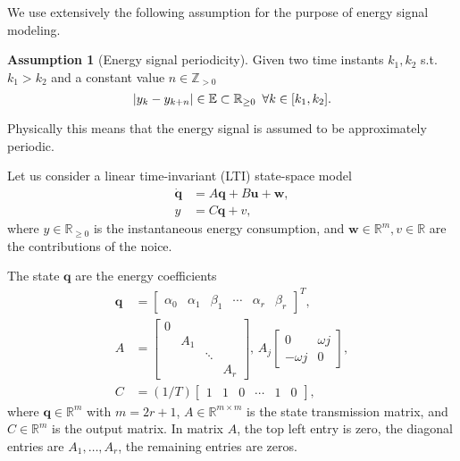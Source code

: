 \documentclass[letterpaper,10pt,conference]{ieeeconf}
\DeclarePairedDelimiter\abs{\lvert}{\rvert}%
\theoremstyle{definition}
\newtheorem{assm}[thm]{Assumption}
\begin{document}
We use extensively the following assumption for the purpose of energy signal modeling.
\begin{assm}[Energy signal periodicity]\label{assm:periodic} 
Given two time instants $k_1,k_2$ s.t. $k_1>k_2$ and a constant value $n\in\mathbb{Z}_{> 0}$
\begin{equation}
  \abs{y_{k}-y_{k+n}}\in\mathbb{E}\subset\mathbb{R}_{\geq 0} \,\,\,\forall k\in[k_1,k_2].
\end{equation}
\end{assm}

Physically this means that the energy signal is assumed to be approximately periodic.

Let us consider a linear time-invariant (LTI) state-space model
\begin{equation}\label{eq:state-perf}\begin{split}
  \dot{\mathbf{q}}&=A\mathbf{q}+B\mathbf{u}+\mathbf{w},\\
  y&=C\mathbf{q}+v,
\end{split}\end{equation}
where $y\in\mathbb{R}_{\geq 0}$ is the instantaneous energy consumption, and $\mathbf{w}\in\mathbb{R}^m,v\in\mathbb{R}$ are the contributions of the noice. 

The state $\mathbf{q}$ are the energy coefficients
\begin{equation}\label{eq:state-details}\begin{split}
  \mathbf{q}&=\left[\begin{array}{cccccc}
    \alpha_0 & \alpha_1 & \beta_1 & \cdots & \alpha_r & \beta_r
  \end{array}\right]^T,\\
  A&=\left[\begin{array}{cccc}
    0&    &       &  \\
     & A_1&       &  \\
     &    & \ddots&  \\
     &    &       & A_r 
  \end{array}\right],\,A_j\begin{bmatrix}0 & \omega j \\ -\omega j & 0\end{bmatrix},\\
  C&=(1/T)\left[\begin{array}{cccccc}
    1 & 1 & 0 &\cdots & 1 & 0
  \end{array}\right],
\end{split}\end{equation}
where $\mathbf{q}\in\mathbb{R}^m$ with $m=2r+1$, $A\in\mathbb{R}^{m\times m}$ is the state transmission matrix, and $C\in\mathbb{R}^m$ is the output matrix. In matrix $A$, the top left entry is zero, the diagonal entries are $A_1,\dots,A_r$, the remaining entries are zeros.
\end{document}

